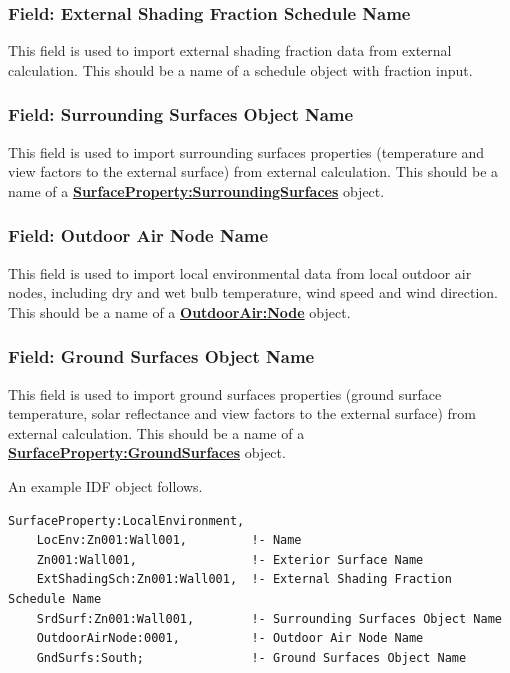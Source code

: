 \subsubsection{Field: External Shading Fraction Schedule Name}\label{field-external-shading-fraction-schedule-name}

This field is used to import external shading fraction data from external calculation. This should be a name of a schedule object with fraction input.

\subsubsection{Field: Surrounding Surfaces Object Name}\label{field-surrounding-surfaces-object-name}

This field is used to import surrounding surfaces properties (temperature and view factors to the external surface) from external calculation. This should be a name of a \textbf{\hyperref[surfacePropertySurroundingSurfaces]{SurfaceProperty:SurroundingSurfaces}} object.

\subsubsection{Field: Outdoor Air Node Name}\label{field-outdoor-air-node-name}

This field is used to import local environmental data from local outdoor air nodes, including dry and wet bulb temperature, wind speed and wind direction. This should be a name of a \textbf{\hyperref[outdoorairnode]{OutdoorAir:Node}} object.

\subsubsection{Field: Ground Surfaces Object Name}\label{field-ground-surfaces-object-name}

This field is used to import ground surfaces properties (ground surface temperature, solar reflectance and view factors to the external surface) from external calculation. This should be a name of a \textbf{\hyperref[surfacePropertyGroundSurfaces]{SurfaceProperty:GroundSurfaces}} object.

An example IDF object follows.

\begin{lstlisting}
SurfaceProperty:LocalEnvironment,
    LocEnv:Zn001:Wall001,         !- Name
    Zn001:Wall001,                !- Exterior Surface Name
    ExtShadingSch:Zn001:Wall001,  !- External Shading Fraction Schedule Name
    SrdSurf:Zn001:Wall001,        !- Surrounding Surfaces Object Name
    OutdoorAirNode:0001,          !- Outdoor Air Node Name
    GndSurfs:South;               !- Ground Surfaces Object Name	
\end{lstlisting}

